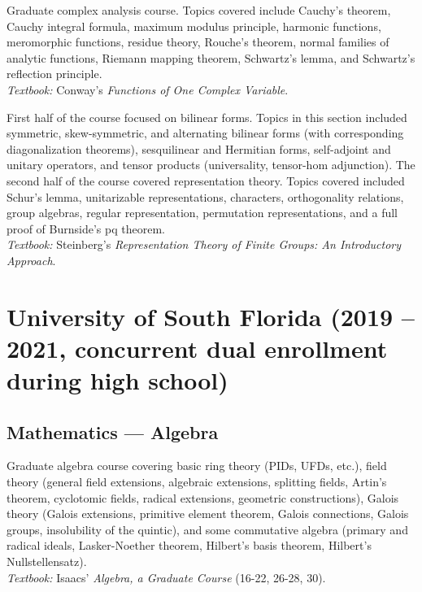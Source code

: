 \documentclass[11pt,letterpaper,sans]{moderncv}
\begin{document}
%
  {Graduate complex analysis course. Topics covered include Cauchy’s theorem, Cauchy integral formula, maximum modulus principle, harmonic functions, meromorphic functions, residue theory, Rouche's theorem, normal families of analytic functions, Riemann mapping theorem, Schwartz's lemma, and Schwartz's reflection principle. \\ \emph{Textbook: }Conway's \emph{Functions of One Complex Variable}.}

%
  {First half of the course focused on bilinear forms. Topics in this section included symmetric, skew-symmetric, and alternating bilinear forms (with corresponding diagonalization theorems), sesquilinear and Hermitian forms, self-adjoint and unitary operators, and tensor products (universality, tensor-hom adjunction). The second half of the course covered representation theory. Topics covered included Schur's lemma, unitarizable representations, characters, orthogonality relations, group algebras, regular representation, permutation representations, and a full proof of Burnside's pq theorem. \\ \emph{Textbook: }Steinberg's \emph{Representation Theory of Finite Groups: An Introductory Approach}.}


\section{University of South Florida (2019 -- 2021, concurrent dual enrollment during high school)}


\subsection{Mathematics --- Algebra}

%
  {Graduate algebra course covering basic ring theory (PIDs, UFDs, etc.), field theory (general field extensions, algebraic extensions, splitting fields, Artin's theorem, cyclotomic fields, radical extensions, geometric constructions), Galois theory (Galois extensions, primitive element theorem, Galois connections, Galois groups, insolubility of the quintic), and some commutative algebra (primary and radical ideals, Lasker-Noether theorem, Hilbert's basis theorem, Hilbert's Nullstellensatz).  \\ \emph{Textbook: }Isaacs' \emph{Algebra, a Graduate Course} (16-22, 26-28, 30).}
\end{document}

